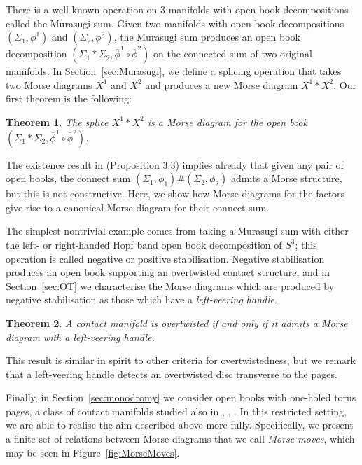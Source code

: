 \documentclass{amsart}
\newtheorem{theorem}{Theorem}[section]
\theoremstyle{definition}
\begin{document}
There is a well-known operation on $3$-manifolds with open book decompositions called the Murasugi sum.  Given two manifolds with open book decompositions $(\Sigma_{1} ,\phi^{1})$ and $(\Sigma_{2},\phi^{2})$, the Murasugi sum produces an open book decomposition $(\Sigma_{1} * \Sigma_2,\overline{\phi}^{1}\circ \overline{\phi}^{2})$ on the connected sum of two original manifolds. In Section~\ref{sec:Murasugi}, we define a splicing operation that takes two Morse diagrams $X^1$ and $X^2$ and produces a new Morse diagram $X^1 * X^2$. Our first theorem is the following:

\begin{theorem}\label{thm:splice}  The splice $X^1*X^2$ is a Morse diagram for the open book $(\Sigma_{1} * \Sigma_2,\overline{\phi}^{1}\circ \overline{\phi}^{2})$.
\end{theorem}

The existence result in \cite{GL} (Proposition 3.3)  implies already that given any pair of open books, the connect sum $(\Sigma_{1},\phi_{1})\#(\Sigma_{2},\phi_{2})$ admits a Morse structure, but this is not constructive.  Here, we show how Morse diagrams for  the factors give rise to a canonical Morse diagram for their connect sum. 

The simplest nontrivial example comes from taking a Murasugi sum with either the left- or right-handed Hopf band open book decomposition of $S^3$; this operation is called negative or positive stabilisation. Negative stabilisation produces an open book supporting an overtwisted contact structure, and in Section~\ref{sec:OT} we characterise the Morse diagrams which are produced by negative stabilisation as those which have a \textit{left-veering handle}. 

\begin{theorem}\label{thm:OT}
A contact manifold is overtwisted if and only if it admits a Morse diagram with a left-veering handle.
\end{theorem} 

This result is similar in spirit to other criteria for overtwistedness, but we remark that a left-veering handle detects an overtwisted disc transverse to the pages. 

Finally, in Section~\ref{sec:monodromy} we consider open books with one-holed torus pages, a class of contact manifolds studied also in \cite{Baldwin}, \cite{Lisca}, \cite{TY}.  In this restricted setting, we are able to realise the aim described above more fully.  Specifically, we present a finite set of relations between Morse diagrams that we call \textit{Morse moves}, which may be seen in Figure~\ref{fig:MorseMoves}. 
\end{document}
